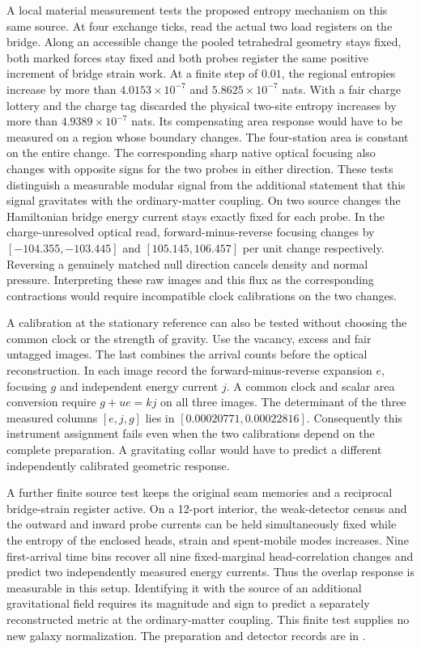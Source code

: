 \documentclass[11pt]{article}
\begin{document}
A local material measurement tests the proposed entropy mechanism on
this same source. At four exchange ticks, read the actual two load
registers on the bridge. Along an accessible change the pooled
tetrahedral geometry stays fixed, both marked forces stay fixed and
both probes register the same positive increment of bridge strain
work. At a finite step of $0.01$, the regional entropies increase by
more than $4.0153\times10^{-7}$ and $5.8625\times10^{-7}$ nats.
With a fair charge lottery and the charge tag discarded the physical
two-site entropy increases by more than $4.9389\times10^{-7}$ nats.
Its compensating area response would have to be measured on a region
whose boundary changes. The four-station area is constant on the
entire change. The corresponding sharp native optical focusing also
changes with opposite signs for the two probes in either direction.
These tests distinguish a measurable modular signal from the
additional statement that this signal gravitates with the
ordinary-matter coupling. On two source changes the Hamiltonian
bridge energy current stays exactly fixed for each probe. In the
charge-unresolved optical read, forward-minus-reverse focusing
changes by $[-104.355,-103.445]$ and $[105.145,106.457]$ per unit
change respectively. Reversing a genuinely matched null direction
cancels density and normal pressure. Interpreting these raw images
and this flux as the corresponding contractions would require
incompatible clock calibrations on the two changes.

A calibration at the stationary reference can also be tested without
choosing the common clock or the strength of gravity. Use the vacancy,
excess and fair untagged images. The last combines the arrival counts
before the optical reconstruction. In each image record the
forward-minus-reverse expansion $e$, focusing $g$ and independent
energy current $j$. A common clock and scalar area conversion
require $g+u e=k j$ on all three images. The determinant of the three
measured columns $[e,j,g]$ lies in $[0.00020771,0.00022816]$.
Consequently this instrument assignment fails even when the two
calibrations depend on the complete preparation. A gravitating collar
would have to predict a different independently calibrated geometric
response.

A further finite source test keeps the original seam memories and a
reciprocal bridge-strain register active. On a 12-port interior,
the weak-detector census and the outward and inward probe currents
can be held simultaneously fixed while the entropy of the enclosed
heads, strain and spent-mobile modes increases. Nine first-arrival
time bins recover all nine fixed-marginal head-correlation changes
and predict two independently measured energy currents. Thus the
overlap response is measurable in this setup. Identifying it with the
source of an additional gravitational field requires its magnitude
and sign to predict a separately reconstructed metric at the
ordinary-matter coupling. This finite test supplies no new galaxy
normalization. The preparation and detector records are in
.
\end{document}
